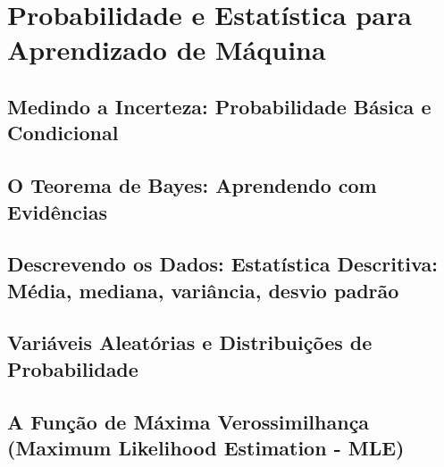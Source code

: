 
\chapter{Probabilidade e Estatística para Aprendizado de Máquina}
\label{cap:probabilidade-e-estatistica-ia}

\section{Medindo a Incerteza: Probabilidade Básica e Condicional} 

\section{O Teorema de Bayes: Aprendendo com Evidências}

\section{Descrevendo os Dados: Estatística Descritiva: Média, mediana, variância, desvio padrão}

\section{Variáveis Aleatórias e Distribuições de Probabilidade}

\section{A Função de Máxima Verossimilhança (Maximum Likelihood Estimation - MLE)}